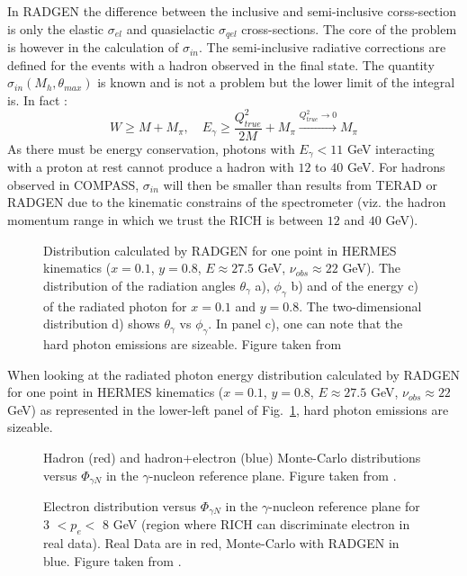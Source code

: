 %
In RADGEN the difference between the inclusive and semi-inclusive corss-section is only the elastic $\sigma_{el}$ and quasielactic $\sigma_{qel}$ cross-sections. The core of the problem is however in the calculation of $\sigma_{in}$. The semi-inclusive radiative corrections are defined for the events with a hadron observed in the final state. The quantity $\sigma_{in}(M_{h},\theta_{max})$ is known and is not a problem but the lower limit of the integral is. In fact :
%
\begin{equation}
    W \geqslant M + M_{\pi},\quad E_{\gamma} \geqslant \frac{Q^2_{true}}{2M}+M_{\pi} \xrightarrow{Q^2_{true} \rightarrow 0} M_{\pi}
\end{equation}
%
As there must be energy conservation, photons with $E_{\gamma} < 11$ GeV interacting with a proton at rest cannot produce a hadron with $12$ to $40$ GeV. For hadrons observed in COMPASS, $\sigma_{in}$ will then be smaller than results from TERAD or RADGEN due to the kinematic constrains of the spectrometer (viz. the hadron momentum range in which we trust the RICH is between $12$ and $40$ GeV).
%
\begin{figure}[htb]
\centerline{}
\caption{Distribution calculated by RADGEN for one point in HERMES kinematics ($x=0.1$, $y=0.8$, $E\approx27.5$ GeV, $\nu_{obs}\approx22$ GeV). The distribution of the radiation angles $\theta_{\gamma}$ a), $\phi_{\gamma}$ b) and of the energy c) of the radiated photon for $x=0.1$ and $y=0.8$. The two-dimensional distribution d) shows $\theta_{\gamma}$ vs $\phi_{\gamma}$. In panel c), one can note that the hard photon emissions are sizeable. Figure taken from \cite{RADGEN}}\label{fig:RAD}
\end{figure}

When looking at the radiated photon energy distribution calculated by RADGEN for one point in HERMES kinematics ($x=0.1$, $y=0.8$, $E\approx27.5$ GeV, $\nu_{obs}\approx22$ GeV) as represented in the lower-left panel of Fig.~\ref{fig:RAD}, hard photon emissions are sizeable.

\begin{figure}[htb!]
\centerline{}
\caption{Hadron (red) and hadron+electron (blue) Monte-Carlo distributions versus $\Phi_{\gamma N}$ in the $\gamma$-nucleon reference plane. Figure taken from \cite{MarcinTalk}.}\label{fig:elprod}
\end{figure}

\begin{figure}[htb!]
\centerline{}
\caption{Electron distribution versus $\Phi_{\gamma N}$ in the $\gamma$-nucleon reference plane for 3 $< p_e <$ 8 GeV (region where RICH can discriminate electron in real data). Real Data are in red, Monte-Carlo with RADGEN in blue. Figure taken from \cite{MarcinTalk}.}\label{fig:ph_pl}
\end{figure}


